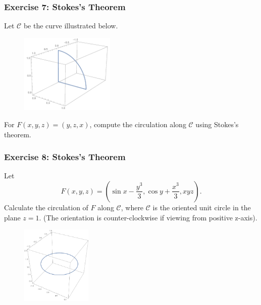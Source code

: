 \documentclass[11pt, t]{beamer}
\begin{document}
\begin{frame}
    \frametitle{Exercise 7: Stokes's Theorem}
    Let $\mathcal{C}$ be the curve illustrated below.
    \begin{figure}[H]
        \centering
        \includegraphics[width=0.4\textwidth]{p2.pdf}
    \end{figure}
    For $F(x,y,z)=(y,z,x)$, compute the circulation along $\mathcal{C}$ using Stokes's theorem.


\end{frame}

\begin{frame}
    \frametitle{Exercise 8: Stokes's Theorem}
    Let $${F}(x, y, z)=\left(\sin x-\dfrac{y^{3}}{3}, \cos y+\dfrac{x^{3}}{3}, x y z\right).$$ Calculate the circulation of $F$ along $\mathcal{C}$, where $\mathcal{C}$ is the oriented unit circle in the plane $z=1$. (The orientation is counter-clockwise if viewing from positive z-axis).
    \begin{figure}[H]
        \centering
        \includegraphics[width=0.3\textwidth]{p3.pdf}
    \end{figure}
\end{frame}
\end{document}
